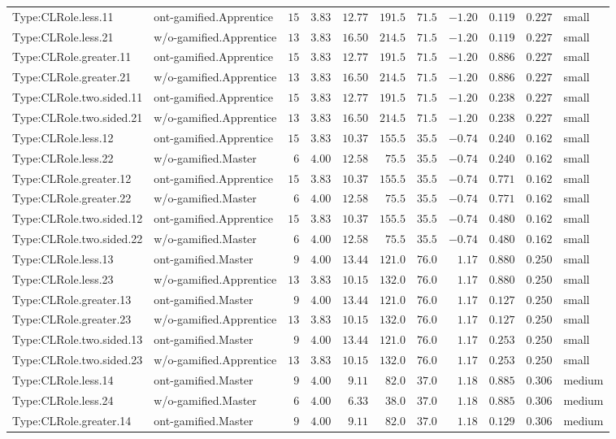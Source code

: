 \documentclass[6pt,a4paper]{article}
\begin{document}
{\begin{longtable}{llrrrrrrrrl}
Type:CLRole.less.11&ont-gamified.Apprentice&$15$&$3.83$&$12.77$&$191.5$&$ 71.5$&$-1.20$&$0.119$&$0.227$&small\tabularnewline
Type:CLRole.less.21&w/o-gamified.Apprentice&$13$&$3.83$&$16.50$&$214.5$&$ 71.5$&$-1.20$&$0.119$&$0.227$&small\tabularnewline
Type:CLRole.greater.11&ont-gamified.Apprentice&$15$&$3.83$&$12.77$&$191.5$&$ 71.5$&$-1.20$&$0.886$&$0.227$&small\tabularnewline
Type:CLRole.greater.21&w/o-gamified.Apprentice&$13$&$3.83$&$16.50$&$214.5$&$ 71.5$&$-1.20$&$0.886$&$0.227$&small\tabularnewline
Type:CLRole.two.sided.11&ont-gamified.Apprentice&$15$&$3.83$&$12.77$&$191.5$&$ 71.5$&$-1.20$&$0.238$&$0.227$&small\tabularnewline
Type:CLRole.two.sided.21&w/o-gamified.Apprentice&$13$&$3.83$&$16.50$&$214.5$&$ 71.5$&$-1.20$&$0.238$&$0.227$&small\tabularnewline
Type:CLRole.less.12&ont-gamified.Apprentice&$15$&$3.83$&$10.37$&$155.5$&$ 35.5$&$-0.74$&$0.240$&$0.162$&small\tabularnewline
Type:CLRole.less.22&w/o-gamified.Master&$ 6$&$4.00$&$12.58$&$ 75.5$&$ 35.5$&$-0.74$&$0.240$&$0.162$&small\tabularnewline
Type:CLRole.greater.12&ont-gamified.Apprentice&$15$&$3.83$&$10.37$&$155.5$&$ 35.5$&$-0.74$&$0.771$&$0.162$&small\tabularnewline
Type:CLRole.greater.22&w/o-gamified.Master&$ 6$&$4.00$&$12.58$&$ 75.5$&$ 35.5$&$-0.74$&$0.771$&$0.162$&small\tabularnewline
Type:CLRole.two.sided.12&ont-gamified.Apprentice&$15$&$3.83$&$10.37$&$155.5$&$ 35.5$&$-0.74$&$0.480$&$0.162$&small\tabularnewline
Type:CLRole.two.sided.22&w/o-gamified.Master&$ 6$&$4.00$&$12.58$&$ 75.5$&$ 35.5$&$-0.74$&$0.480$&$0.162$&small\tabularnewline
Type:CLRole.less.13&ont-gamified.Master&$ 9$&$4.00$&$13.44$&$121.0$&$ 76.0$&$ 1.17$&$0.880$&$0.250$&small\tabularnewline
Type:CLRole.less.23&w/o-gamified.Apprentice&$13$&$3.83$&$10.15$&$132.0$&$ 76.0$&$ 1.17$&$0.880$&$0.250$&small\tabularnewline
Type:CLRole.greater.13&ont-gamified.Master&$ 9$&$4.00$&$13.44$&$121.0$&$ 76.0$&$ 1.17$&$0.127$&$0.250$&small\tabularnewline
Type:CLRole.greater.23&w/o-gamified.Apprentice&$13$&$3.83$&$10.15$&$132.0$&$ 76.0$&$ 1.17$&$0.127$&$0.250$&small\tabularnewline
Type:CLRole.two.sided.13&ont-gamified.Master&$ 9$&$4.00$&$13.44$&$121.0$&$ 76.0$&$ 1.17$&$0.253$&$0.250$&small\tabularnewline
Type:CLRole.two.sided.23&w/o-gamified.Apprentice&$13$&$3.83$&$10.15$&$132.0$&$ 76.0$&$ 1.17$&$0.253$&$0.250$&small\tabularnewline
Type:CLRole.less.14&ont-gamified.Master&$ 9$&$4.00$&$ 9.11$&$ 82.0$&$ 37.0$&$ 1.18$&$0.885$&$0.306$&medium\tabularnewline
Type:CLRole.less.24&w/o-gamified.Master&$ 6$&$4.00$&$ 6.33$&$ 38.0$&$ 37.0$&$ 1.18$&$0.885$&$0.306$&medium\tabularnewline
Type:CLRole.greater.14&ont-gamified.Master&$ 9$&$4.00$&$ 9.11$&$ 82.0$&$ 37.0$&$ 1.18$&$0.129$&$0.306$&medium\tabularnewline

\end{longtable}}
\end{document}
